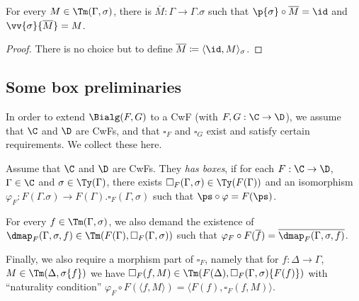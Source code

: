 \documentclass{article}
\begin{document}
\begin{lemma}
  For every $M \in \Tm(\Gamma, \sigma)$, there is $\overline{M} :
  \Gamma \to \Gamma.\sigma$ such that $\p{\sigma} \circ \overline{M} =
  \id$ and $\vv{\sigma}\{\overline{M}\} = M$.
\end{lemma}
\begin{proof}
  There is no choice but to define $\overline{M} \coloneqq \langle \id, M\rangle_{\sigma}$.
\end{proof}

\subsection{Some box preliminaries}

In order to extend $\Bialg(F, G)$ to a CwF (with $F, G : \C \to \D$),
we assume that $\C$ and $\D$ are CwFs, and that $\square_F$ and
$\square_G$ exist and satisfy certain requirements. We collect these here.

\begin{definition}
  Assume that $\C$ and $\D$ are CwFs. They \emph{has boxes}, if for
  each $F : \C \to \D$, $\Gamma \in \C$ and $\sigma \in \Ty(\Gamma)$,
  there exists $\square_F(\Gamma, \sigma) \in \Ty(F(\Gamma))$ and an
  isomorphism $\varphi_F : F(\Gamma.\sigma) \to F(\Gamma).\square_F(\Gamma, \sigma)$
  such that $\ps \circ \varphi = F(\ps)$.

  For every $f \in \Tm(\Gamma, \sigma)$, we also demand the existence of
  $\dmap_F(\Gamma, \sigma, f) \in \Tm(F(\Gamma), \square_F(\Gamma, \sigma))$
  such that $\varphi_F \circ F(\overline{f}) = \overline{\dmap_F(\Gamma, \sigma, f)}$.

  Finally, we also require a morphism part of $\square_F$, namely that
  for $f : \Delta \to \Gamma$, $M \in \Tm(\Delta, \sigma\{f\})$ we
  have $\square_F(f, M) \in \Tm(F(\Delta), \square_F(\Gamma,
  \sigma)\{F(f)\})$ with ``naturality condition'' $\varphi_F \circ
  F(\langle f , M\rangle) = \langle F(f), \square_F(f, M)\rangle$.
\end{definition}
\end{document}
